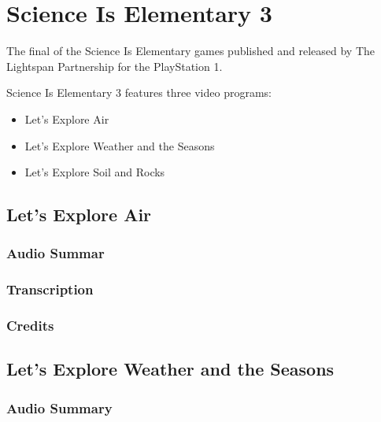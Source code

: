 \chapter{Science Is Elementary 3}


The final of the Science Is Elementary games published and released by The Lightspan Partnership for the PlayStation 1.

Science Is Elementary 3 features three video programs:

\begin{itemize}
    \item Let's Explore Air
    \item Let's Explore Weather and the Seasons
    \item Let's Explore Soil and Rocks
\end{itemize}

\clearpage
\newpage

\section{Let's Explore Air}

\subsection{Audio Summar}

\subsection{Transcription}

\subsection{Credits}

\section{Let's Explore Weather and the Seasons}

\subsection{Audio Summary}

